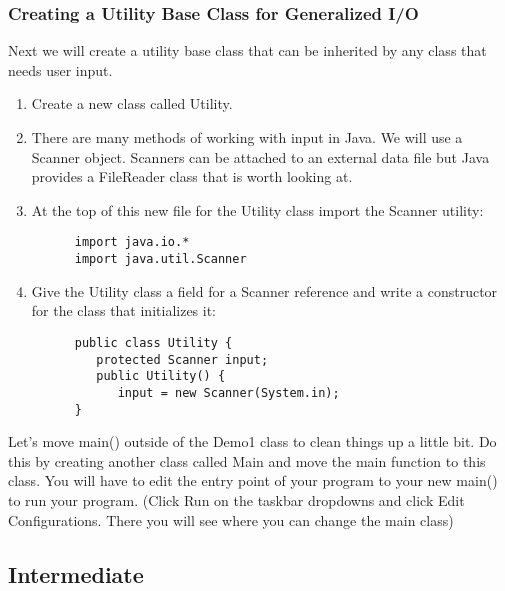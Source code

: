 \documentclass[../../main.tex]{subfiles}
\begin{document}
\subsubsection{Creating a Utility Base Class for Generalized I/O}
   \begin{steps}
      \item Next we will create a utility base class that can be inherited by any class that
          needs user input.
   \begin{enumerate}[label=\Alph*.]
      \item Create a new class called Utility.
      \item There are many methods of working with input in Java. We will use a Scanner object.
         Scanners can be attached to an external data file but Java provides a FileReader class
         that is worth looking at.
      \item At the top of this new file for the Utility class import the Scanner utility:
         \begin{verbatim}
      import java.io.* 
      import java.util.Scanner
         \end{verbatim}
      \item Give the Utility class a field for a Scanner reference and write a constructor
         for the class that initializes it:
         \begin{verbatim}
      public class Utility {
         protected Scanner input;
         public Utility() {
            input = new Scanner(System.in);
      }
         \end{verbatim}
   \end{enumerate}
      \item Let's move main() outside of the Demo1 class to clean things up a little bit.
         Do this by creating another class called Main and move the main function to
         this class. You will have to edit the entry point of your program to your new main()
         to run your program. (Click Run on the taskbar dropdowns and click Edit Configurations.
         There you will see where you can change the main class)
   \end{steps}
\subsection{Intermediate}
\end{document}

